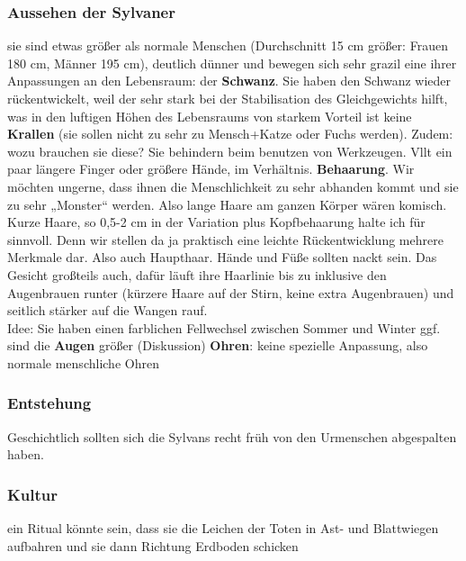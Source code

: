 \subsubsection{Aussehen der Sylvaner}
\begin{outline}
	\1 sie sind etwas größer als normale Menschen (Durchschnitt 15 cm größer: Frauen 180 cm, Männer 195 cm), deutlich dünner und bewegen sich sehr grazil
	\1 eine ihrer Anpassungen an den Lebensraum: der \textbf{Schwanz}. Sie haben den Schwanz wieder rückentwickelt, weil der sehr stark bei der Stabilisation des Gleichgewichts hilft, was in den luftigen Höhen des Lebensraums von starkem Vorteil ist
	\1 keine \textbf{Krallen} (sie sollen nicht zu sehr zu Mensch+Katze oder Fuchs werden). Zudem: wozu brauchen sie diese? Sie behindern beim benutzen von Werkzeugen. Vllt ein paar längere Finger oder größere Hände, im Verhältnis. 
	\1 \textbf{Behaarung}. Wir möchten ungerne, dass ihnen die Menschlichkeit zu sehr abhanden kommt und sie zu sehr „Monster“ werden. Also lange Haare am ganzen Körper wären komisch. Kurze Haare, so 0,5-2 cm in der Variation plus Kopfbehaarung halte ich für sinnvoll. Denn wir stellen da ja praktisch eine leichte Rückentwicklung mehrere Merkmale dar. Also auch Haupthaar. Hände und Füße sollten nackt sein. Das Gesicht großteils auch, dafür läuft ihre Haarlinie bis zu inklusive den Augenbrauen runter (kürzere Haare auf der Stirn, keine extra Augenbrauen) und seitlich stärker auf die Wangen rauf.\\
	Idee: Sie haben einen farblichen Fellwechsel zwischen Sommer und Winter
	\1 ggf. sind die \textbf{Augen} größer (Diskussion)
	\1 \textbf{Ohren}: keine spezielle Anpassung, also normale menschliche Ohren
\end{outline}

\subsubsection{Entstehung}
Geschichtlich sollten sich die Sylvans recht früh von den Urmenschen abgespalten haben.

\subsubsection{Kultur}
\begin{outline}
	\1 ein Ritual könnte sein, dass sie die Leichen der Toten in Ast- und Blattwiegen aufbahren und sie dann  Richtung Erdboden schicken
\end{outline}





